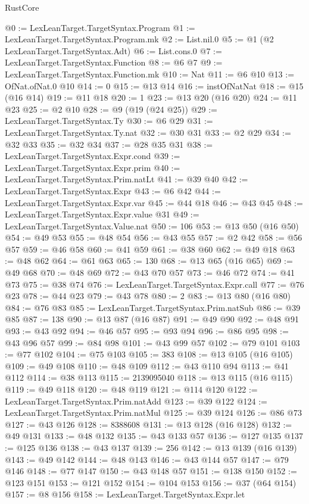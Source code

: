 \begin{lexlean}{RustCore}
\begin{coremodule}
@0 := LexLeanTarget.TargetSyntax.Program
@1 := LexLeanTarget.TargetSyntax.Program.mk
@2 := List.nil.{0}
@5 := @1 (@2 LexLeanTarget.TargetSyntax.Adt)
@6 := List.cons.{0}
@7 := LexLeanTarget.TargetSyntax.Function
@8 := @6 @7
@9 := LexLeanTarget.TargetSyntax.Function.mk
@10 := Nat
@11 := @6 @10
@13 := OfNat.ofNat.{0} @10
@14 := 0
@15 := @13 @14
@16 := instOfNatNat
@18 := @15 (@16 @14)
@19 := @11 @18
@20 := 1
@23 := @13 @20 (@16 @20)
@24 := @11 @23
@25 := @2 @10
@28 := @9 (@19 (@24 @25))
@29 := LexLeanTarget.TargetSyntax.Ty
@30 := @6 @29
@31 := LexLeanTarget.TargetSyntax.Ty.nat
@32 := @30 @31
@33 := @2 @29
@34 := @32 @33
@35 := @32 @34
@37 := @28 @35 @31
@38 := LexLeanTarget.TargetSyntax.Expr.cond
@39 := LexLeanTarget.TargetSyntax.Expr.prim
@40 := LexLeanTarget.TargetSyntax.Prim.natLt
@41 := @39 @40
@42 := LexLeanTarget.TargetSyntax.Expr
@43 := @6 @42
@44 := LexLeanTarget.TargetSyntax.Expr.var
@45 := @44 @18
@46 := @43 @45
@48 := LexLeanTarget.TargetSyntax.Expr.value @31
@49 := LexLeanTarget.TargetSyntax.Value.nat
@50 := 106
@53 := @13 @50 (@16 @50)
@54 := @49 @53
@55 := @48 @54
@56 := @43 @55
@57 := @2 @42
@58 := @56 @57
@59 := @46 @58
@60 := @41 @59
@61 := @38 @60
@62 := @49 @18
@63 := @48 @62
@64 := @61 @63
@65 := 130
@68 := @13 @65 (@16 @65)
@69 := @49 @68
@70 := @48 @69
@72 := @43 @70 @57
@73 := @46 @72
@74 := @41 @73
@75 := @38 @74
@76 := LexLeanTarget.TargetSyntax.Expr.call
@77 := @76 @23
@78 := @44 @23
@79 := @43 @78
@80 := 2
@83 := @13 @80 (@16 @80)
@84 := @76 @83
@85 := LexLeanTarget.TargetSyntax.Prim.natSub
@86 := @39 @85
@87 := 138
@90 := @13 @87 (@16 @87)
@91 := @49 @90
@92 := @48 @91
@93 := @43 @92
@94 := @46 @57
@95 := @93 @94
@96 := @86 @95
@98 := @43 @96 @57
@99 := @84 @98
@101 := @43 @99 @57
@102 := @79 @101
@103 := @77 @102
@104 := @75 @103
@105 := 383
@108 := @13 @105 (@16 @105)
@109 := @49 @108
@110 := @48 @109
@112 := @43 @110 @94
@113 := @41 @112
@114 := @38 @113
@115 := 2139095040
@118 := @13 @115 (@16 @115)
@119 := @49 @118
@120 := @48 @119
@121 := @114 @120
@122 := LexLeanTarget.TargetSyntax.Prim.natAdd
@123 := @39 @122
@124 := LexLeanTarget.TargetSyntax.Prim.natMul
@125 := @39 @124
@126 := @86 @73
@127 := @43 @126
@128 := 8388608
@131 := @13 @128 (@16 @128)
@132 := @49 @131
@133 := @48 @132
@135 := @43 @133 @57
@136 := @127 @135
@137 := @125 @136
@138 := @43 @137
@139 := 256
@142 := @13 @139 (@16 @139)
@143 := @49 @142
@144 := @48 @143
@146 := @43 @144 @57
@147 := @79 @146
@148 := @77 @147
@150 := @43 @148 @57
@151 := @138 @150
@152 := @123 @151
@153 := @121 @152
@154 := @104 @153
@156 := @37 (@64 @154)
@157 := @8 @156
@158 := LexLeanTarget.TargetSyntax.Expr.let

\end{coremodule}
\end{lexlean}
